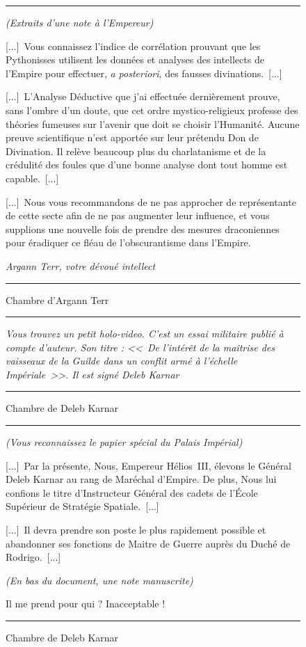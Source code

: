 \documentclass{article}
\newcommand{\newcharacter}{\clearpage\setcounter{figure}{0}}
\newcommand{\indice}[4]{
    \begin{figure}[H]
        \begin{center}
            \rule{0.5\textwidth}{1pt}
        \end{center}
        \begin{framed}
            \begin{samepage}
                \textit{#1}
                \nopagebreak

                #2

                \nopagebreak

                \hfill\textit{#3}
            \end{samepage}
        \end{framed}
        \caption{#4}
        \begin{center}
            \rule{0.5\textwidth}{1pt}
        \end{center}
    \end{figure}
}
\begin{document}
\indice
{(Extraits d'une note à l'Empereur)}
{[...]~Vous connaissez l'indice de corrélation prouvant que les Pythonisses
utilisent les données et analyses des intellects de l'Empire pour effectuer,
\textit{a posteriori}, des fausses divinations.~[...]

\nobreak

[...]~L'Analyse Déductive que j'ai effectuée dernièrement prouve, sans l'ombre
d'un doute, que cet ordre mystico-religieux professe des théories fumeuses sur
l'avenir que doit se choisir l'Humanité. Aucune preuve scientifique n'est
apportée sur leur prétendu Don de Divination. Il relève beaucoup plus du
charlatanisme et de la crédulité des foules que d'une bonne analyse dont tout
homme est capable.~[...]

\nobreak

[...]~Nous vous recommandons de ne pas approcher de représentante de cette
secte afin de ne pas augmenter leur influence, et vous supplions une nouvelle
fois de prendre des mesures draconiennes pour éradiquer ce fléau de
l'obscurantisme dans l'Empire.}
{Argann Terr, votre dévoué intellect}
{Chambre d'Argann Terr}

\newcharacter

\indice
{Vous trouvez un petit holo-video. C’est un essai militaire publié à compte
d’auteur. Son titre : <<~De l’intérêt de la maîtrise des vaisseaux de la Guilde
dans un conflit armé à l’échelle Impériale~>>. Il est signé Deleb Karnar}
{}
{}
{Chambre de Deleb Karnar}

\indice
{(Vous reconnaissez le papier spécial du Palais Impérial)}
{[...]~Par la présente, Nous, Empereur Hélios~III, élevons le Général Deleb
Karnar au rang de Maréchal d’Empire. De plus, Nous lui confions le titre
d’Instructeur Général des cadets de l’École Supérieur de Stratégie
Spatiale.~[...]

\nobreak

[...]~Il devra prendre son poste le plus rapidement possible et abandonner ses
fonctions de Maitre de Guerre auprès du Duché de Rodrigo.~[...]

\nobreak

\textit{(En bas du document, une note manuscrite)}

\nobreak

Il me prend pour qui ? Inacceptable !}
{}
{Chambre de Deleb Karnar}
\end{document}
